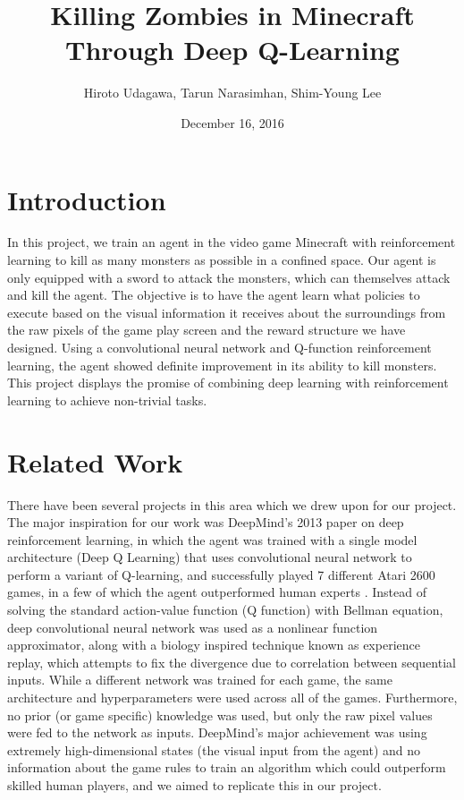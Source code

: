 \documentclass{article}
\title{Killing Zombies in Minecraft Through Deep Q-Learning}
\author{Hiroto Udagawa, Tarun Narasimhan, Shim-Young Lee}
\date{December 16, 2016}
\begin{document}
\maketitle

\begin{multicols}{2}

\section{Introduction}

In this project, we train an agent in the video game Minecraft with reinforcement learning to kill as many monsters as possible in a confined space. Our agent is only equipped with a sword to attack the monsters,  which can themselves attack and kill the agent.
The objective is to have the agent learn what policies to execute based on the visual information it receives about the surroundings from the raw pixels of the game play screen and the reward structure we have designed.
Using a convolutional neural network and Q-function reinforcement learning, the agent showed definite improvement in its ability to kill monsters.
This project displays the promise of combining deep learning with reinforcement learning to achieve non-trivial tasks.






\section{Related Work}

There have been several projects in this area which we drew upon for our project.
The major inspiration for our work was DeepMind's 2013 paper on deep reinforcement learning, in which the agent was trained with a single model architecture (Deep Q Learning) that uses convolutional neural network to perform a variant of Q-learning, and successfully played 7 different Atari 2600 games, in a few of which the agent outperformed human experts \cite{deepMind}.
Instead of solving the standard action-value function (Q function) with Bellman equation, deep convolutional neural network was used as a nonlinear function approximator, along with a biology inspired technique known as experience replay, which attempts to fix the divergence due to correlation between sequential inputs.
While a different network was trained for each game, the same architecture and hyperparameters were used across all of the games.
Furthermore, no prior (or game specific) knowledge was used, but only the raw pixel values were fed to the network as inputs.
DeepMind's major achievement was using extremely high-dimensional states (the visual input from the agent) and no information about the game rules to train an algorithm which could outperform skilled human players, and we aimed to replicate this in our project.


\end{multicols}
\end{document}
